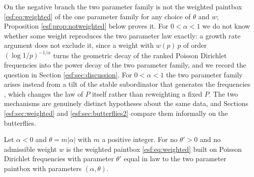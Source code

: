 \begin{remark}
On the negative branch the two parameter family is not the weighted paintbox \eqref{esf:eq:weighted} of the one
parameter family for any choice of $\theta$ and $w$; Proposition \ref{esf:prop:notweighted} below proves it. For $0 < \alpha < 1$ we do not know whether some weight reproduces the two parameter law exactly: a growth rate argument does not exclude it, since a weight with $w(p)\,p$ of order $(\log 1/p)^{-1/\alpha}$ turns the geometric decay of the ranked Poisson Dirichlet frequencies into the power decay of the two parameter family, and we record the question in Section \ref{esf:sec:discussion}. For $0 < \alpha < 1$ the two parameter family arises instead from a tilt of the stable
subordinator that generates the frequencies \citep{esf:perman1992,esf:pitmanyor1997}, which changes the law of $P$ itself
rather than reweighting a fixed $P$. The two mechanisms are genuinely distinct
hypotheses about the same data, and Sections \ref{esf:sec:weighted} and \ref{esf:sec:butterflies2} compare them
informally on the butterflies.
\end{remark}

\begin{proposition}
\label{esf:prop:notweighted}
Let $\alpha < 0$ and $\theta = m|\alpha|$ with $m$ a positive integer. For no $\theta' > 0$ and no admissible weight $w$ is the weighted paintbox \eqref{esf:eq:weighted} built on Poisson Dirichlet frequencies with parameter $\theta'$ equal in law to the two parameter paintbox with parameters $(\alpha, \theta)$.
\end{proposition}

